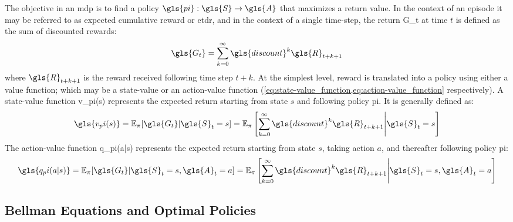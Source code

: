 The objective in an \gls{mdp} is to find a policy 
\(\gls{pi}: \gls{S} \rightarrow \gls{A}\) that maximizes a return value. 
In the context of an episode it may be referred to as expected cumulative 
reward or \gls{etdr}, and in the context of a single time-step, 
the return \gls{G_t} at time \(t\) is defined as the sum of discounted rewards:
\begin{equation}
    \gls{G_t} = \sum_{k=0}^{\infty} \gls{discount}^k \gls{R}_{t+k+1}
    \label{eq:sum_discounted_rewards}
\end{equation}
where \(\gls{R}_{t+k+1}\) is the reward received following time step \(t+k\).
At the simplest level, reward is translated into a policy using either a 
value function; which may be a state-value or an action-value function 
(\cref{eq:state-value_function,eq:action-value_function} respectively).
A state-value function \gls{v_pi(s)} represents the expected return starting 
from state \(s\) and following policy \gls{pi}. It is generally defined as:
\begin{equation}
    \gls{v_pi(s)} 
    = \mathbb{E}_\pi [\gls{G_t}| \gls{S}_t = s] = \mathbb{E}_\pi \left[
        \sum_{k=0}^{\infty} \gls{discount}^k \gls{R}_{t+k+1} 
        \middle| \gls{S}_t = s \right]
    \label{eq:state-value_function}
\end{equation}
The action-value function \gls{q_pi(a|s)} represents the expected return 
starting from state \(s\), taking action \(a\), 
and thereafter following policy \gls{pi}:
\begin{equation}
    \gls{q_pi(a|s)} 
    = \mathbb{E}_\pi [\gls{G_t}| \gls{S}_t = s, \gls{A}_t = a] 
    = \mathbb{E}_\pi \left[ 
        \sum_{k=0}^{\infty} \gls{discount}^k \gls{R}_{t+k+1}
        \middle| \gls{S}_t=s, \gls{A}_t=a \right]
    \label{eq:action-value_function}
\end{equation}

    \subsection*{Bellman Equations and Optimal Policies}%

